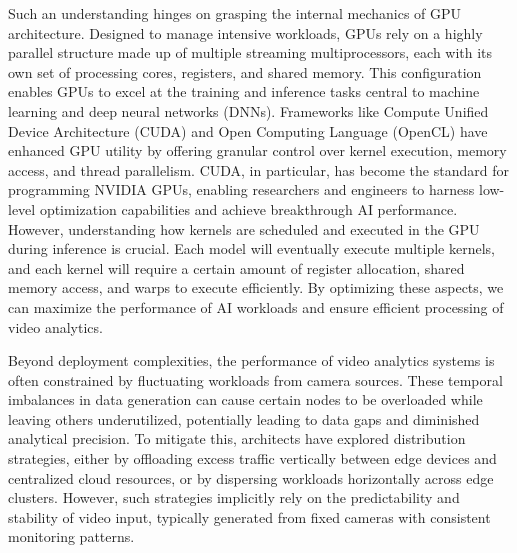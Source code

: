 Such an understanding hinges on grasping the internal mechanics of GPU architecture. Designed to manage intensive workloads, GPUs rely on a highly parallel structure made up of multiple streaming multiprocessors, each with its own set of processing cores, registers, and shared memory. This configuration enables GPUs to excel at the training and inference tasks central to machine learning and deep neural networks (DNNs). Frameworks like Compute Unified Device Architecture (CUDA) and Open Computing Language (OpenCL) have enhanced GPU utility by offering granular control over kernel execution, memory access, and thread parallelism. CUDA, in particular, has become the standard for programming NVIDIA GPUs, enabling researchers and engineers to harness low-level optimization capabilities and achieve breakthrough AI performance. However, understanding how kernels are scheduled and executed in the GPU during inference is crucial. Each model will eventually execute multiple kernels, and each kernel will require a certain amount of register allocation, shared memory access, and warps to execute efficiently. By optimizing these aspects, we can maximize the performance of AI workloads and ensure efficient processing of video analytics.

Beyond deployment complexities, the performance of video analytics systems is often constrained by fluctuating workloads from camera sources. These temporal imbalances in data generation can cause certain nodes to be overloaded while leaving others underutilized, potentially leading to data gaps and diminished analytical precision. To mitigate this, architects have explored distribution strategies, either by offloading excess traffic vertically between edge devices and centralized cloud resources, or by dispersing workloads horizontally across edge clusters. However, such strategies implicitly rely on the predictability and stability of video input, typically generated from fixed cameras with consistent monitoring patterns.

